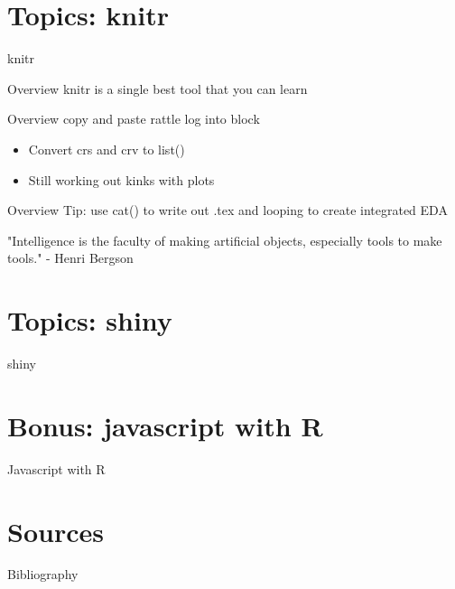 \documentclass[xcolor=dvipsnames]{beamer}
\begin{document}
\section{Topics: knitr}
\begin{frame}[t,allowframebreaks]{knitr}
\begin{block}{Overview }
knitr is a single best tool that you can learn
\end{block}
\begin{block}{Overview }
copy and paste rattle log into block
\end{block}

\begin{itemize}
\item Convert crs and crv to list()
\item Still working out kinks with plots
\end{itemize}
\begin{block}{Overview }
Tip: use cat() to write out .tex and looping to create integrated EDA
\end{block}
"Intelligence is the faculty of making artificial objects, especially tools to make tools." - Henri Bergson
\end{frame}


\section{Topics: shiny}
\begin{frame}[t,allowframebreaks]{shiny}
\end{frame}

\section{Bonus: javascript with R}
\begin{frame}[t,allowframebreaks]{Javascript with R}
\end{frame}

\section{Sources}
\footnotesize
\begin{frame}[t,allowframebreaks]{Bibliography}


\end{frame}
 
\end{document}
